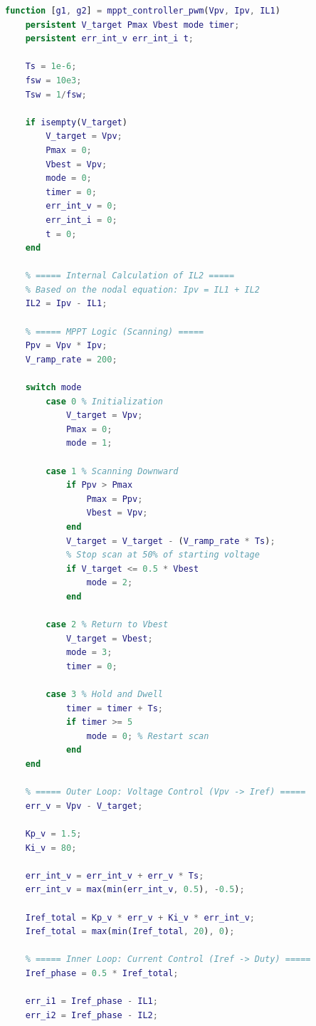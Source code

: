\begin{lstlisting}[language=Matlab, caption={MATLAB code implementing the FSM-based global MPPT control loop.}]
function [g1, g2] = mppt_controller_pwm(Vpv, Ipv, IL1)
    persistent V_target Pmax Vbest mode timer;
    persistent err_int_v err_int_i t;
    
    Ts = 1e-6;      
    fsw = 10e3;     
    Tsw = 1/fsw;
    
    if isempty(V_target)
        V_target = Vpv; 
        Pmax = 0;
        Vbest = Vpv;
        mode = 0;
        timer = 0;
        err_int_v = 0;
        err_int_i = 0;
        t = 0;
    end
    
    % ===== Internal Calculation of IL2 =====
    % Based on the nodal equation: Ipv = IL1 + IL2
    IL2 = Ipv - IL1; 
    
    % ===== MPPT Logic (Scanning) =====
    Ppv = Vpv * Ipv;
    V_ramp_rate = 200; 
    
    switch mode
        case 0 % Initialization
            V_target = Vpv;
            Pmax = 0;
            mode = 1;
            
        case 1 % Scanning Downward
            if Ppv > Pmax
                Pmax = Ppv;
                Vbest = Vpv;
            end
            V_target = V_target - (V_ramp_rate * Ts);
            % Stop scan at 50% of starting voltage
            if V_target <= 0.5 * Vbest 
                mode = 2;
            end
            
        case 2 % Return to Vbest
            V_target = Vbest;
            mode = 3;
            timer = 0;
            
        case 3 % Hold and Dwell
            timer = timer + Ts;
            if timer >= 5 
                mode = 0; % Restart scan
            end
    end
    
    % ===== Outer Loop: Voltage Control (Vpv -> Iref) =====
    err_v = Vpv - V_target; 
    
    Kp_v = 1.5; 
    Ki_v = 80;
    
    err_int_v = err_int_v + err_v * Ts;
    err_int_v = max(min(err_int_v, 0.5), -0.5); 
    
    Iref_total = Kp_v * err_v + Ki_v * err_int_v; 
    Iref_total = max(min(Iref_total, 20), 0); 
    
    % ===== Inner Loop: Current Control (Iref -> Duty) =====
    Iref_phase = 0.5 * Iref_total;
    
    err_i1 = Iref_phase - IL1;
    err_i2 = Iref_phase - IL2;
    

\end{lstlisting}
